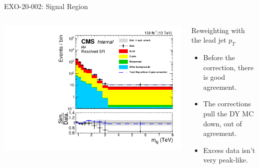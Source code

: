 \documentclass[aspectratio=169]{beamer}
\begin{document}
\begin{frame}{EXO-20-002: Signal Region}
  \begin{columns}
    \begin{column}{0.50\textwidth}
      \centering
      \includegraphics[width=\textwidth]{../figures/histograms/mass_fourobject_mumu_resolved_sr.pdf}
    \end{column}
    \begin{column}{0.50\textwidth}
        \centering
        \resizebox{0.55\columnwidth}{!}{%
        
        }
      \begin{block}{Reweighting with the lead jet $p_T$}
        \begin{itemize}
          \item Before the correction, there is good agreement.
          \item The corrections pull the DY MC down, out of agreement.
          \item Excess data isn't very peak-like.
        \end{itemize}
      \end{block}
    \end{column}
  \end{columns}
\end{frame}
\end{document}
